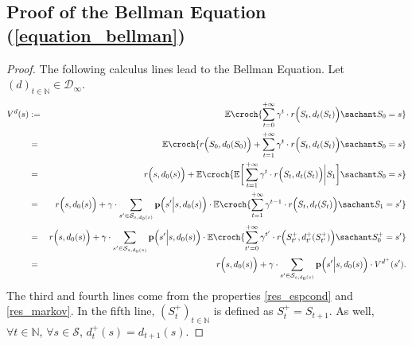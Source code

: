 \subsection{Proof of the Bellman Equation (\ref{equation_bellman})}
\label{equation_bellman_RETURN}
\begin{proof}
The following calculus lines 
lead to the Bellman Equation.
Let $(d)_{t \in \mathbb{N}} \in \mathcal{D}_{\infty}$.
\begin{eqnarray}
\nonumber  V^{d}(s) &  := & \mathbb{E} \croch{ \sum_{t=0}^{+\infty} \gamma^{t} \cdot r\Big(S_{t},d_t(S_{t})\Big) \sachant S_0=s}  \\
\nonumber & = & \mathbb{E} \croch{ r\Big(S_0,d_0(S_0)\Big) + \sum_{t=1}^{+\infty} \gamma^{t} \cdot r\Big(S_{t},d_t(S_{t})\Big) \sachant S_0=s} \\
\nonumber & = & r\Big(s,d_0(s)\Big) + \mathbb{E} \croch{ \mathbb{E} \bigg[ \sum_{t=1}^{+\infty} \gamma^{t} \cdot r\Big(S_{t},d_t(S_{t})\Big) \bigg\vert S_1 \bigg] \sachant S_0=s  } \\
\nonumber & = & r\Big(s,d_0(s)\Big) + \gamma \cdot \sum_{s' \in \mathcal{S}_{s,d_0(s)}} \textbf{p} \Big(s' \Big\vert s,d_0(s) \Big) \cdot  \mathbb{E} \croch{ \sum_{t=1}^{+\infty} \gamma^{t-1} \cdot r\Big(S_{t},d_t(S_{t})\Big) \sachant S_1=s' }  \\
\nonumber & = & r\Big(s,d_0(s)\Big) + \gamma \cdot \sum_{s' \in \mathcal{S}_{s,d_0(s)}} \textbf{p} \Big( s' \Big\vert s,d_0(s) \Big) \cdot  \mathbb{E} \croch{ \sum_{t'=0}^{+\infty} \gamma^{t'} \cdot r\Big(S^+_{t'},d^+_{t'}(S^+_{t'})\Big) \sachant S^+_0=s' } \\
\nonumber & = & r\Big(s,d_0(s)\Big) + \gamma \cdot \sum_{s' \in \mathcal{S}_{s,d_0(s)}} \textbf{p} \Big(s' \Big\vert s,d_0(s)\Big)  \cdot V^{d^+}(s').
\end{eqnarray}
The third and fourth lines come from the properties \ref{res_espcond} and \ref{res_markov}.
In the fifth line, $(S^+_t)_{t \in \mathbb{N}}$ is defined as
$S^+_t = S_{t+1}$. 
As well, $\forall t \in \mathbb{N}$, 
$\forall s \in \mathcal{S}$,
$d^+_t(s) = d_{t+1}(s)$. 
\end{proof}






